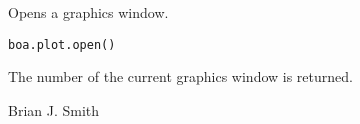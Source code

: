 \begin{Description}\relax
Opens a graphics window.
\end{Description}
\begin{Usage}
\begin{verbatim}
boa.plot.open()
\end{verbatim}
\end{Usage}
\begin{Value}
The number of the current graphics window is returned.
\end{Value}
\begin{Author}\relax
Brian J. Smith
\end{Author}
\begin{SeeAlso}\relax
{}
\end{SeeAlso}

